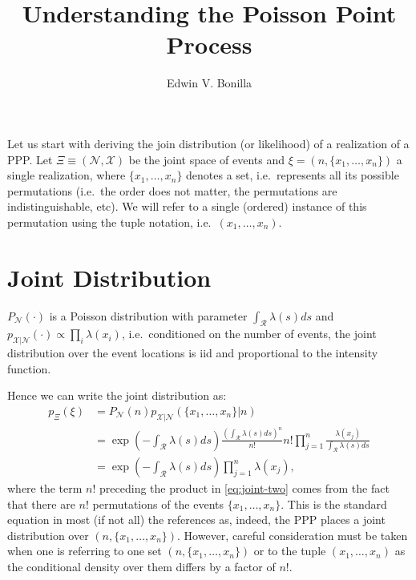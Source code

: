 \documentclass{article}
\title{Understanding the Poisson Point Process}
\author{Edwin V. Bonilla}
\newcommand{\calR}{\mathcal{R}}
\newcommand{\ls}{\lambda(s)}
\begin{document}
	\maketitle
	Let us start with deriving the join distribution (or likelihood) of a realization of a \gls{PPP}. Let $\Xi \equiv (\mathcal{N}, \mathcal{X})$  be the joint space of events and $\xi = (n, \{x_1, \ldots, x_n\})$ a single realization, where $\{x_1, \ldots, x_n \}$ denotes a set, i.e.~represents all its possible permutations (i.e.~the order does not matter, the permutations are indistinguishable, etc). We will refer to a single (ordered) instance of this permutation using the tuple notation, i.e.~$(x_1, \ldots, x_n)$.
	
	\section{Joint Distribution}
	
	$P_{\mathcal{N}}(\cdot)$ is a Poisson distribution with parameter $\int_{\calR} \ls ds$ and $p_{\mathcal{X} | \mathcal{N}} (\cdot) \propto \prod_{i}   \lambda(x_i)$, i.e.~conditioned on the number of events, the joint distribution over the event locations is iid and proportional to the intensity function. 
	  
	Hence we can write the joint distribution as:
	\begin{align}
	p_{\Xi}(\xi) &= P_{\mathcal{N}}(n) p_{\mathcal{X} | \mathcal{N}}(\{x_1, \ldots, x_n \} | n )\\
	\label{eq:joint-two}
	&= \exp\left(-\int_{\calR} \ls ds\right) \frac{\left(\int_{\calR} \ls ds \right)^{n}}{n!} n! \prod_{j=1}^{n}  \frac{\lambda(x_j)}{\int_{\calR} \lambda(s) ds} \\
	&= \exp\left(-\int_{\calR} \ls ds\right) \prod_{j=1}^{n}  {\lambda(x_j)} \text{,}
	\end{align}
	where the term $n!$ preceding the product in \cref{eq:joint-two} comes from the fact that there are $n!$ permutations of the events $\{x_1, \ldots, x_n\}$. 
	This is the standard equation in most (if not all) the references as, indeed, the \gls{PPP} places a joint distribution over $(n, \{x_1, \ldots, x_n\})$. However, careful consideration must be taken when one is referring to one set $(n, \{x_1, \ldots, x_n\})$ or to the tuple $(x_1, \ldots, x_n)$ as the conditional density over them differs by a factor of  $n!$. 
	
\end{document}

